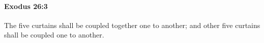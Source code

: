 
		\paragraph{Exodus 26:3} %
			\label{EXODUS-26-3}

			The five curtains shall be coupled together one to another; and other five curtains shall be coupled one to another.



